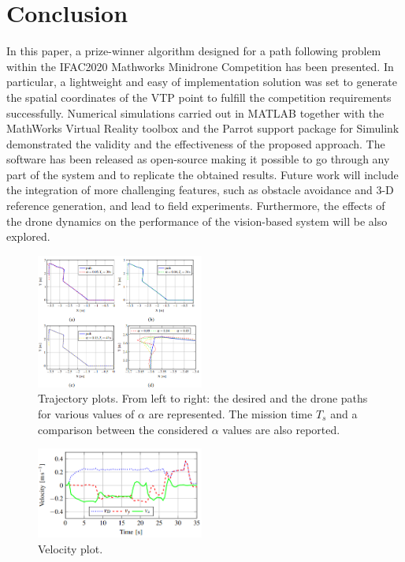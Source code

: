 \documentclass[a4paper,twocolumn,10pt]{article}
\begin{document}
    \section{Conclusion}
    \label{sec:conclu}
    In this paper, a prize-winner algorithm designed for a path following problem within the IFAC2020 Mathworks Minidrone Competition has been presented. In particular, a lightweight and easy of implementation solution was set to generate the spatial coordinates of the VTP point to fulfill the competition requirements successfully. Numerical simulations carried out in MATLAB together with the MathWorks Virtual Reality toolbox and the Parrot support package for Simulink demonstrated the validity and the effectiveness of the proposed approach. The software has been released as open-source making it possible to go through any part of the system and to replicate the obtained results. Future work will include the integration of more challenging features, such as obstacle avoidance and 3-D reference generation, and lead to field experiments. Furthermore, the effects of the drone dynamics on the performance of the vision-based system will be also explored. 
    \begin{figure}
        \centering
        \includegraphics[width=0.49\textwidth]{pics/fig10_graph.png}
        \caption{Trajectory plots. From left to right: the desired and the drone paths for various values of $\alpha$ are represented. The mission time $T_s$ and a comparison between the considered $\alpha$ values are also reported.}
        \label{fig:fig10graphs}
    \end{figure}
    \begin{figure}
        \centering
        \includegraphics[width=0.49\textwidth]{pics/fig11_graph.png}
        \caption{Velocity plot.}
        \label{fig:fig11graph}
    \end{figure}
\end{document}
